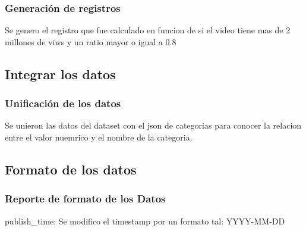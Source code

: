     \subsubsection{Generación de registros}
        Se genero el registro  que fue calculado en funcion de si
        el video tiene mas de 2 millones de viws y un ratio mayor o igual a 0.8
\subsection{Integrar los datos}
    \subsubsection{Unificación de los datos}
        Se unieron las datos del dataset con el json de categorias para conocer
        la relacion entre el valor nuemrico y el nombre de la categoria.
\subsection{Formato de los datos}
    \subsubsection{Reporte de formato de los Datos}
        publish\_time: Se modifico el timestamp por un formato tal: YYYY-MM-DD